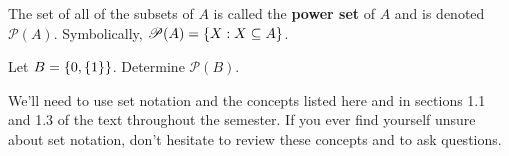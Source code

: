 	The set of all of the subsets of $A$ is called the \textbf{power set} of $A$ and is denoted $\mathscr{P}(A)$.  Symbolically, $\mathscr{P}(A) = \left\{X : X \subseteq A\right\}$.\\
	\begin{question}[resume]
	\item Let $B = \left\{0,\left\{1\right\}\right\}$.  Determine $\mathscr{P}(B)$.
	\vspace{1in}
	\end{question}


We'll need to use set notation and the concepts listed here and in sections 1.1 and 1.3 of the text throughout the semester.  If you ever find yourself unsure about set notation, don't hesitate to review these concepts and to ask questions.





